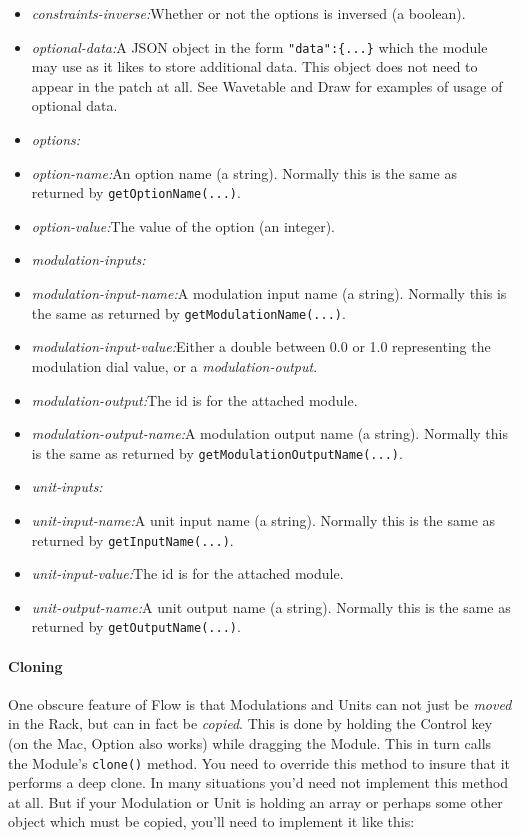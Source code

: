\documentclass{article}
\newcommand\name{Flow}
\begin{document}
\begin{itemize}
\item {\it constraints-inverse:}\quad Whether or not the options is inversed (a boolean).
\item {\it optional-data:}\quad A JSON object in the form {\tt "data":\{...\}} which the module may use as it likes to store additional data.  This object does not need to appear in the patch at all.  See Wavetable and Draw for examples of usage of optional data.
\item {\it options:}
\item {\it option-name:}\quad An option name (a string).  Normally this is the same as returned by {\tt getOptionName(...)}.
\item {\it option-value:}\quad The value of the option (an integer). 
\item {\it modulation-inputs:}
\item {\it modulation-input-name:}\quad A modulation input name (a string).  Normally this is the same as returned by {\tt getModulationName(...)}.
\item {\it modulation-input-value:}\quad Either a double between 0.0 or 1.0 representing the modulation dial value, or a {\it modulation-output}. 
\item {\it modulation-output:}\qquad The id is for the attached module.
\item {\it modulation-output-name:}\quad A modulation output name (a string).  Normally this is the same as returned by {\tt getModulationOutputName(...)}.
\item {\it unit-inputs:}
\item {\it unit-input-name:}\quad A unit input name (a string).  Normally this is the same as returned by {\tt getInputName(...)}.
\item {\it unit-input-value:}\qquad The id is for the attached module.
\item {\it unit-output-name:}\quad A unit output name (a string).  Normally this is the same as returned by {\tt getOutputName(...)}.
\end{itemize}

\paragraph{Cloning}  One obscure feature of {\name} is that Modulations and Units can not just be {\it moved} in the Rack, but can in fact be {\it copied}.  This is done by holding the Control key (on the Mac, Option also works) while dragging the Module.  This in turn calls the Module's {\tt clone()} method.  You need to override this method to insure that it performs a deep clone.  In many situations you'd need not implement this method at all.  But if your Modulation or Unit is holding an array or perhaps some other object which must be copied, you'll need to implement it like this:
\end{document}
